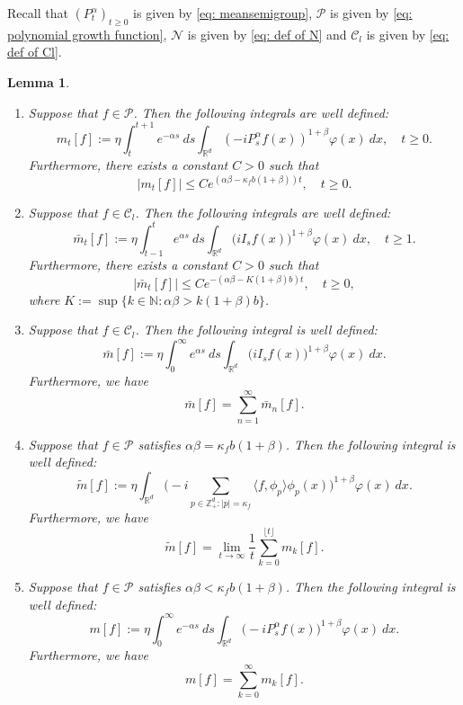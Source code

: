 \documentclass[12pt,a4paper]{amsart}
\theoremstyle{plain}
\newtheorem{lem}[thm]{Lemma}
\theoremstyle{definition}
\numberwithin{equation}{section}
\begin{document}
   Recall that
    $(P^\alpha_t)_{t\geq 0}$ is given by \eqref{eq: meansemigroup}, $\mathcal P$ is given by \eqref{eq: polynomial growth function}, $\mathcal N$ is given by \eqref{eq: def of N} and $\mathcal C_l$ is given by \eqref{eq: def of Cl}.
\begin{lem}
\label{lem: def of all m}
\begin{enumerate}
\item
	Suppose that $f\in\mathcal{P}$. Then the following integrals are well defined:
\[
	m_t[f]
        := \eta \int_t^{t+1}e^{-\alpha s}~ds\int_{\mathbb R^d} (-iP_{s}^\alpha f(x))^{1+\beta} \varphi(x)~dx,
    \quad t\geq 0.
\]
	Furthermore, there exists a constant $C>0$ such that
\begin{equation}\label{domi-m}
    |m_t[f]|
    \leq C e^{(\alpha\beta-\kappa_fb(1+\beta))t},
    \quad t\geq 0.
\end{equation}
\item
    Suppose that $f\in\mathcal C_l$. Then the following integrals are well defined:
\[
    \bar{m}_t[f]
    := \eta \int_{t-1}^{t} e^{\alpha s}~ds \int_{\mathbb R^d}\big(iI_sf(x)\big)^{1+\beta} \varphi(x)~dx, \quad t\geq 1.
\]
    Furthermore, there exists a constant $C>0$ such that
\begin{equation}
    |\bar{m}_t[f]| \leq C e^{-(\alpha\beta-K(1+\beta)b)t}, \quad t\geq 0,
\end{equation}
	where $K:=\sup\{k\in \mathbb N : \alpha\beta>k(1+\beta)b\}$.
\item
    Suppose that $f \in \mathcal C_l$.
    Then the following integral is well defined:
\[
    \bar{m}[f]
   :=\eta \int_{0}^{\infty} e^{\alpha s}~ds \int_{\mathbb R^d} \big(iI_sf(x)\big)^{1+\beta}\varphi(x)~dx.
\]
    Furthermore, we have
\begin{equation}\label{sum-bar-m}
    \bar{m}[f]
    =\sum_{n=1}^{\infty}\bar{m}_n[f].
\end{equation}
\item
	Suppose that $f \in \mathcal{P}$ satisfies  $\alpha\beta=\kappa_f b(1+\beta)$. Then the following integral is well defined:
\[
	\tilde{m}[f]
    := \eta\int_{\mathbb R^d} \Big(-i\sum_{p\in \mathbb Z_+^d:|p|=\kappa_f}\langle f,\phi_p\rangle\phi_p(x)\Big)^{1+\beta} \varphi(x)~dx.
\]
	Furthermore, we have
\begin{equation}
\label{para: critical case}
	\widetilde{m}[f] = \lim_{t\rightarrow \infty}\frac{1}{t}\sum_{k=0}^{\lfloor t \rfloor}m_k[f].
\end{equation}
\item
	Suppose that $f\in \mathcal{P}$ satisfies $\alpha\beta<\kappa_fb(1+\beta)$.
	Then the following integral is well defined:
\[
    m[f]
    :=\eta \int_0^{\infty} e^{-\alpha s} ~ds\int_{\mathbb R^d} \big(-iP_s^\alpha f(x)\big)^{1+\beta} \varphi(x)~dx.
\]
	Furthermore, we have
\begin{equation}\label{sum-m}
	m[f]
    =\sum_{k=0}^\infty m_k[f].
\end{equation}
\end{enumerate}
\end{lem}
\end{document}
